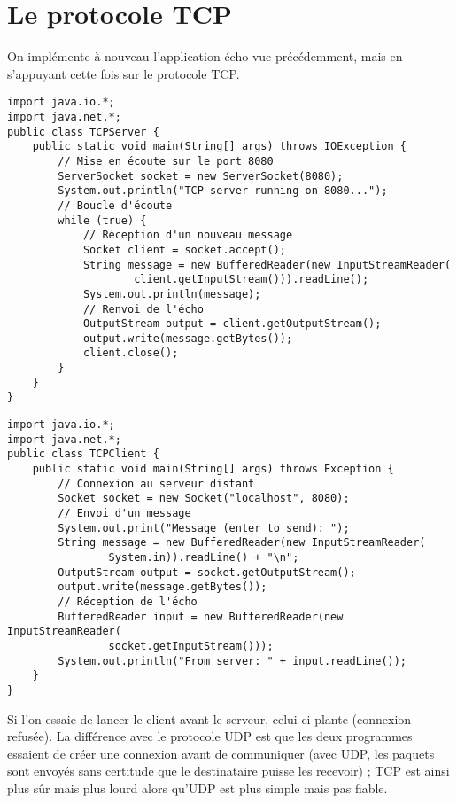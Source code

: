 \documentclass[a4paper]{article}
\begin{document}
\section{Le protocole TCP}

On implémente à nouveau l'application écho vue précédemment, mais en s'appuyant cette fois sur le protocole TCP.

\begin{lstlisting}
import java.io.*;
import java.net.*;
public class TCPServer {
    public static void main(String[] args) throws IOException {
    	// Mise en écoute sur le port 8080
        ServerSocket socket = new ServerSocket(8080);
        System.out.println("TCP server running on 8080...");
        // Boucle d'écoute
        while (true) {
        	// Réception d'un nouveau message
            Socket client = socket.accept();
            String message = new BufferedReader(new InputStreamReader(
            		client.getInputStream())).readLine();
            System.out.println(message);
            // Renvoi de l'écho
            OutputStream output = client.getOutputStream();
            output.write(message.getBytes());
            client.close();
        }
    }
}
\end{lstlisting}

\begin{lstlisting}
import java.io.*;
import java.net.*;
public class TCPClient {
    public static void main(String[] args) throws Exception {
        // Connexion au serveur distant
        Socket socket = new Socket("localhost", 8080);
        // Envoi d'un message
        System.out.print("Message (enter to send): ");
        String message = new BufferedReader(new InputStreamReader(
        		System.in)).readLine() + "\n";
        OutputStream output = socket.getOutputStream();
        output.write(message.getBytes());
        // Réception de l'écho
        BufferedReader input = new BufferedReader(new InputStreamReader(
        		socket.getInputStream()));
        System.out.println("From server: " + input.readLine());
    }
}
\end{lstlisting}

Si l'on essaie de lancer le client avant le serveur, celui-ci plante (connexion refusée). La différence avec le protocole UDP est que les deux programmes essaient de créer une connexion avant de communiquer (avec UDP, les paquets sont envoyés sans certitude que le destinataire puisse les recevoir) ; TCP est ainsi plus sûr mais plus lourd alors qu'UDP est plus simple mais pas fiable.
\end{document}
